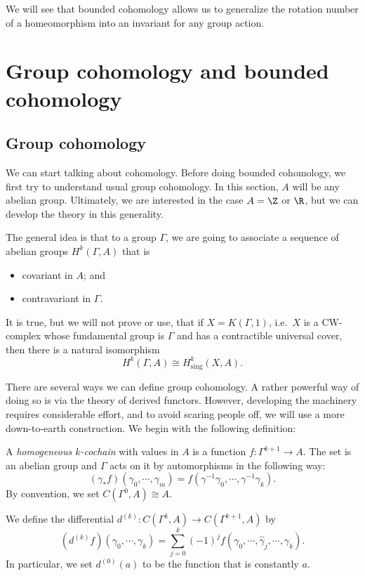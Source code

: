 \documentclass[a4paper]{article}
\begin{document}
We will see that bounded cohomology allows us to generalize the rotation number of a homeomorphism into an invariant for any group action.

\section{Group cohomology and bounded cohomology}
\subsection{Group cohomology}
We can start talking about cohomology. Before doing bounded cohomology, we first try to understand usual group cohomology. In this section, $A$ will be any abelian group. Ultimately, we are interested in the case $A = \Z$ or $\R$, but we can develop the theory in this generality.

The general idea is that to a group $\Gamma$, we are going to associate a sequence of abelian groups $H^k(\Gamma, A)$ that is
\begin{itemize}
  \item covariant in $A$; and
  \item contravariant in $\Gamma$.
\end{itemize}
It is true, but we will not prove or use, that if $X = K(\Gamma, 1)$, i.e.\ $X$ is a CW-complex whose fundamental group is $\Gamma$ and has a contractible universal cover, then there is a natural isomorphism
\[
  H^k(\Gamma, A) \cong H^k_{\mathrm{sing}}(X, A).
\]

There are several ways we can define group cohomology. A rather powerful way of doing so is via the theory of derived functors. However, developing the machinery requires considerable effort, and to avoid scaring people off, we will use a more down-to-earth construction. We begin with the following definition:

\begin{defi}
  A \emph{homogeneous $k$-cochain} with values in $A$ is a function $f\colon \Gamma^{k + 1} \to A$. The set  is an abelian group and $\Gamma$ acts on it by automorphisms in the following way:
  \[
    (\gamma_* f) (\gamma_0, \cdots, \gamma_m) = f(\gamma^{-1} \gamma_0, \cdots, \gamma^{-1} \gamma_k).
  \]
  By convention, we set $C(\Gamma^0, A) \cong A$.
\end{defi}

\begin{defi}[Differential $d^{(k)}$]
  We define the differential $d^{(k)}\colon C(\Gamma^k, A) \to C(\Gamma^{k + 1}, A)$ by
  \[
    (d^{(k)}f) (\gamma_0, \cdots, \gamma_k) = \sum_{j = 0}^k (-1)^j f(\gamma_0, \cdots, \hat{\gamma}_j, \cdots, \gamma_k).
  \]
  In particular, we set $d^{(0)}(a)$ to be the function that is constantly $a$.
\end{defi}
\end{document}

